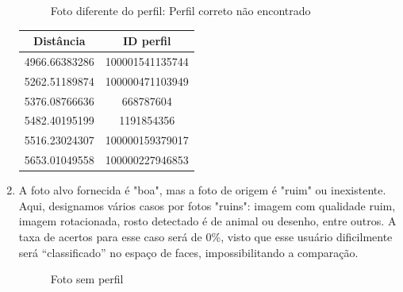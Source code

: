 \documentclass[10pt,a4paper]{article}
\begin{document}
\begin{enumerate}
\begin{flushleft}
\begin{figure}[h!]
\begin{flushleft}
  
\caption{Foto diferente do perfil: Perfil correto não encontrado}
\par\end{flushleft}
\end{figure}
\par\end{flushleft}


\begin{table}[h!]
\begin{center}
\begin{tabular}{cc}
Distância & ID perfil \\
\hline
4966.66383286 & 100001541135744\\
5262.51189874 & 100000471103949\\
5376.08766636 & 668787604\\
5482.40195199 & 1191854356\\
5516.23024307 & 100000159379017\\
5653.01049558 & 100000227946853
\end{tabular}
\end{center}
\end{table}

	\item A foto alvo fornecida é "boa", mas a foto de origem é "ruim" ou inexistente. Aqui, designamos vários casos por fotos "ruins": imagem com qualidade ruim, imagem rotacionada, rosto detectado é de animal ou desenho, entre outros. A taxa de acertos para esse caso será de 0\%, visto que esse usuário dificilmente será “classificado” no espaço de faces, impossibilitando a comparação.



\begin{flushleft}
\begin{figure}[h!]
\begin{flushleft}
  
\caption{Foto sem perfil}
\par\end{flushleft}
\end{figure}
\par\end{flushleft}



\end{enumerate}
\end{document}

